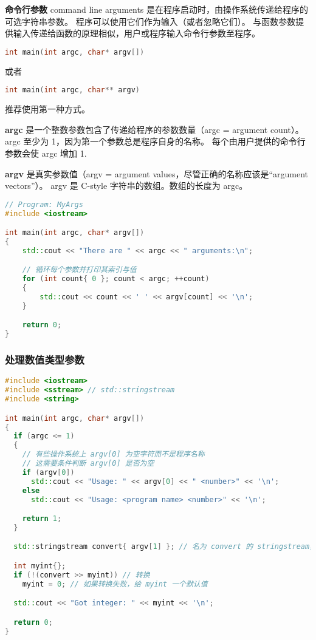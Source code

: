 \documentclass[../../LearnCpp.tex]{subfiles}
\begin{document}

\textbf{命令行参数} command line arguments 是在程序启动时，由操作系统传递给程序的可选字符串参数。
程序可以使用它们作为输入（或者忽略它们）。
与函数参数提供输入传递给函数的原理相似，用户或程序输入命令行参数至程序。

\begin{lstlisting}[language=C++]
int main(int argc, char* argv[])
\end{lstlisting}

或者

\begin{lstlisting}[language=C++]
int main(int argc, char** argv)
\end{lstlisting}

推荐使用第一种方式。

\textbf{argc} 是一个整数参数包含了传递给程序的参数数量（argc = argument count）。
argc 至少为 1，因为第一个参数总是程序自身的名称。
每个由用户提供的命令行参数会使 argc 增加 1.

\textbf{argv} 是真实参数值（argv = argument values，尽管正确的名称应该是“argument vectors”）。
argv 是 C-style 字符串的数组。数组的长度为 argc。

\begin{lstlisting}[language=C++]
// Program: MyArgs
#include <iostream>

int main(int argc, char* argv[])
{
    std::cout << "There are " << argc << " arguments:\n";

    // 循环每个参数并打印其索引与值
    for (int count{ 0 }; count < argc; ++count)
    {
        std::cout << count << ' ' << argv[count] << '\n';
    }

    return 0;
}
\end{lstlisting}

\subsubsection*{处理数值类型参数}

\begin{lstlisting}[language=C++]
#include <iostream>
#include <sstream> // std::stringstream
#include <string>

int main(int argc, char* argv[])
{
  if (argc <= 1)
  {
    // 有些操作系统上 argv[0] 为空字符而不是程序名称
    // 这需要条件判断 argv[0] 是否为空
    if (argv[0])
      std::cout << "Usage: " << argv[0] << " <number>" << '\n';
    else
      std::cout << "Usage: <program name> <number>" << '\n';

    return 1;
  }

  std::stringstream convert{ argv[1] }; // 名为 convert 的 stringstream，使用 argv[1] 进行初始化

  int myint{};
  if (!(convert >> myint)) // 转换
    myint = 0; // 如果转换失败，给 myint 一个默认值

  std::cout << "Got integer: " << myint << '\n';

  return 0;
}
\end{lstlisting}
\end{document}
